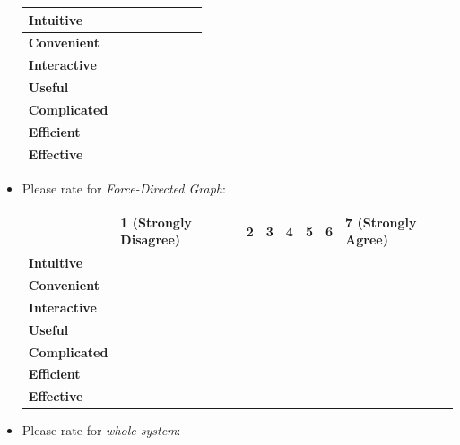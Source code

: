 \begin{itemize}
\begin{center}
\begin{tabular}{ | l | l | l | l | l | l | l | l | }
			\textbf{Intuitive}   &                       &   &   &   &   &   &                    \\ \hline
			\textbf{Convenient}  &                       &   &   &   &   &   &                    \\ \hline
			\textbf{Interactive} &                       &   &   &   &   &   &                    \\ \hline
			\textbf{Useful}      &                       &   &   &   &   &   &                    \\ \hline
			\textbf{Complicated} &                       &   &   &   &   &   &                    \\ \hline
			\textbf{Efficient}   &                       &   &   &   &   &   &                    \\ \hline
			\textbf{Effective}   &                       &   &   &   &   &   &                    \\ \hline
		\end{tabular}
	\end{center}
		\item Please rate for \textit{Force-Directed Graph}:
	\begin{center}
		\begin{tabular}{ | l | l | l | l | l | l | l | l | }
			\hline
			& 1 (Strongly Disagree) & 2 & 3 & 4 & 5 & 6 & 7 (Strongly Agree) \\ \hline
			\textbf{Intuitive}   &                       &   &   &   &   &   &                    \\ \hline
			\textbf{Convenient}  &                       &   &   &   &   &   &                    \\ \hline
			\textbf{Interactive} &                       &   &   &   &   &   &                    \\ \hline
			\textbf{Useful}      &                       &   &   &   &   &   &                    \\ \hline
			\textbf{Complicated} &                       &   &   &   &   &   &                    \\ \hline
			\textbf{Efficient}   &                       &   &   &   &   &   &                    \\ \hline
			\textbf{Effective}   &                       &   &   &   &   &   &                    \\ \hline
		\end{tabular}
	\end{center}
		\item Please rate for \textit{whole system}:

\end{itemize}
